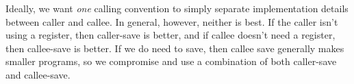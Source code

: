       Ideally, we want \textit{one} calling convention to simply separate implementation details between caller and callee. In general, however, neither is best. If the caller isn't using a register, then caller-save is better, and if callee doesn't need a register, then callee-save is better. If we do need to save, then callee save generally makes smaller programs, so we compromise and use a combination of both caller-save and callee-save. 



